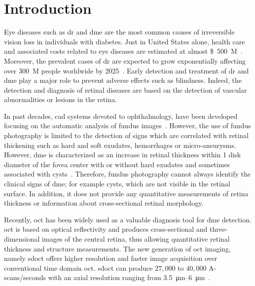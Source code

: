 \graphicspath{ {./content/intro/figures/} }

\section{Introduction}

Eye diseases such as \ac{dr} and \ac{dme} are the most common causes of irreversible vision loss in individuals with diabetes.
Just in United States alone, health care and associated costs related to eye diseases are estimated at almost \SI{500}[\$]{M}~\cite{Sharma2005}.
Moreover, the prevalent cases of \ac{dr} are expected to grow exponentially affecting over \SI{300}{M} people worldwide by 2025~\cite{Wild2004}.
Early detection and treatment of \ac{dr} and \ac{dme} play a major role to prevent adverse effects such as blindness.
Indeed, the detection and diagnosis of retinal diseases are based on the detection of vascular abnormalities or lesions in the retina. 

In past decades, \ac{cad} systems devoted to ophthalmology, have been developed focusing on the automatic analysis of fundus images~\cite{Abramoff2010,Trucco2013}.
However, the use of fundus photography is limited to the detection of signs which are correlated with retinal thickening such as hard and soft exudates, hemorrhages or micro-aneurysms.
However, \ac{dme} is characterized as an increase in retinal thickness within 1 disk diameter of the fovea center with or without hard exudates and sometimes associated with cysts~\cite{ETDRSG1985}.
Therefore, fundus photography cannot always identify the clinical signs of \ac{dme}; for example cysts, which are not visible in the retinal surface. In addition, it does not provide any quantitative measurements of retina thickness or information about cross-sectional retinal morphology. 

Recently, \ac{oct} has been widely used as a valuable diagnosis tool for \ac{dme} detection.
\ac{oct} is based on optical reflectivity and produces cross-sectional and three-dimensional images of the central retina, thus allowing quantitative retinal thickness and structure measurements.
The new generation of \ac{oct} imaging, namely \ac{sdoct} offers higher resolution and faster image acquisition over conventional time domain \ac{oct}. \Ac{sdoct} can produce $27,000$ to $40,000$ A-scans/seconds with an axial resolution ranging from \SIrange{3.5}{6}{\micro \metre}~\cite{Chen2005}. 

